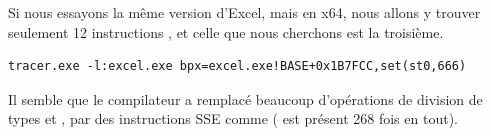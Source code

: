 Si nous essayons la même version d'Excel, mais en x64, nous allons y trouver seulement
12 instructions \FDIV, et celle que nous cherchons est la troisième.

\begin{lstlisting}
tracer.exe -l:excel.exe bpx=excel.exe!BASE+0x1B7FCC,set(st0,666)
\end{lstlisting}


Il semble que le compilateur a remplacé beaucoup d'opérations de division de types
\Tfloat et \Tdouble, par des instructions SSE comme  ( est présent
268 fois en tout).
